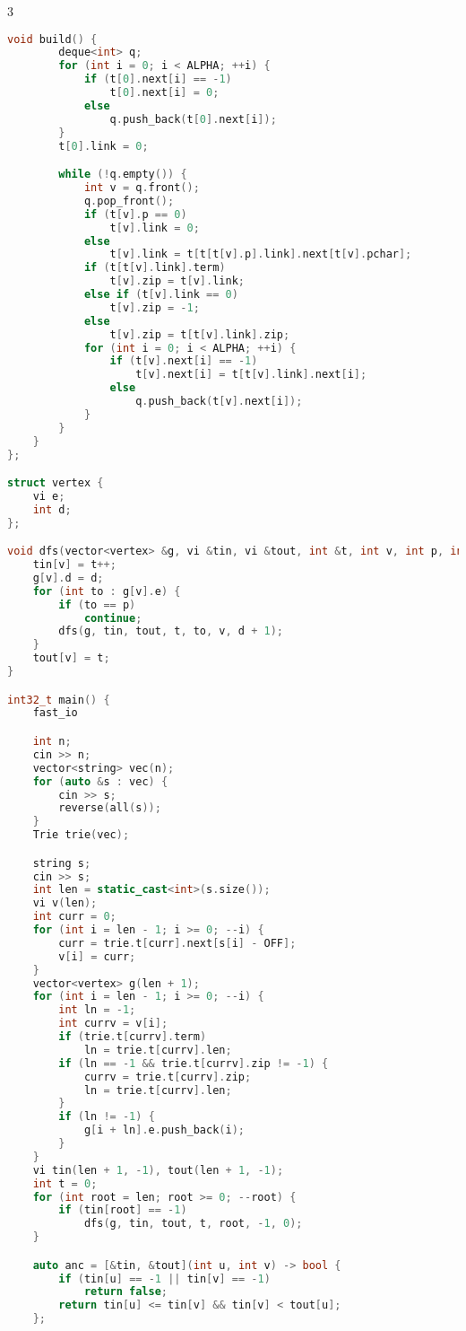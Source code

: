 \documentclass[10pt,a4paper,landscape,twosided]{extarticle}
\begin{document}
\begin{multicols}{3}
\begin{lstlisting}[language=C++]
    void build() {
        deque<int> q;
        for (int i = 0; i < ALPHA; ++i) {
            if (t[0].next[i] == -1)
                t[0].next[i] = 0;
            else
                q.push_back(t[0].next[i]);
        }
        t[0].link = 0;

        while (!q.empty()) {
            int v = q.front();
            q.pop_front();
            if (t[v].p == 0)
                t[v].link = 0;
            else
                t[v].link = t[t[t[v].p].link].next[t[v].pchar];
            if (t[t[v].link].term)
                t[v].zip = t[v].link;
            else if (t[v].link == 0)
                t[v].zip = -1;
            else
                t[v].zip = t[t[v].link].zip;
            for (int i = 0; i < ALPHA; ++i) {
                if (t[v].next[i] == -1)
                    t[v].next[i] = t[t[v].link].next[i];
                else
                    q.push_back(t[v].next[i]);
            }
        }
    }
};

struct vertex {
    vi e;
    int d;
};

void dfs(vector<vertex> &g, vi &tin, vi &tout, int &t, int v, int p, int d) {
    tin[v] = t++;
    g[v].d = d;
    for (int to : g[v].e) {
        if (to == p)
            continue;
        dfs(g, tin, tout, t, to, v, d + 1);
    }
    tout[v] = t;
}

int32_t main() {
    fast_io

    int n;
    cin >> n;
    vector<string> vec(n);
    for (auto &s : vec) {
        cin >> s;
        reverse(all(s));
    }
    Trie trie(vec);

    string s;
    cin >> s;
    int len = static_cast<int>(s.size());
    vi v(len);
    int curr = 0;
    for (int i = len - 1; i >= 0; --i) {
        curr = trie.t[curr].next[s[i] - OFF];
        v[i] = curr;
    }
    vector<vertex> g(len + 1);
    for (int i = len - 1; i >= 0; --i) {
        int ln = -1;
        int currv = v[i];
        if (trie.t[currv].term)
            ln = trie.t[currv].len;
        if (ln == -1 && trie.t[currv].zip != -1) {
            currv = trie.t[currv].zip;
            ln = trie.t[currv].len;
        }
        if (ln != -1) {
            g[i + ln].e.push_back(i);
        }
    }
    vi tin(len + 1, -1), tout(len + 1, -1);
    int t = 0;
    for (int root = len; root >= 0; --root) {
        if (tin[root] == -1)
            dfs(g, tin, tout, t, root, -1, 0);
    }

    auto anc = [&tin, &tout](int u, int v) -> bool {
        if (tin[u] == -1 || tin[v] == -1)
            return false;
        return tin[u] <= tin[v] && tin[v] < tout[u];
    };


\end{lstlisting}
\end{multicols}
\end{document}
